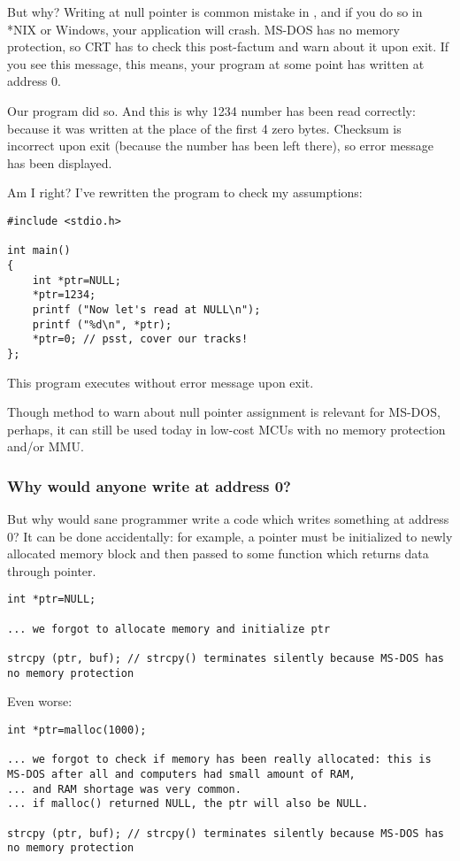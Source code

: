 But why? Writing at null pointer is common mistake in \CCpp, and if you do so in *NIX or Windows, your application will crash.
MS-DOS has no memory protection, so \ac{CRT} has to check this post-factum and warn about it upon exit.
If you see this message, this means, your program at some point has written at address 0.

Our program did so. And this is why 1234 number has been read correctly: because it was written at the place of the first 4 zero bytes.
Checksum is incorrect upon exit (because the number has been left there), so error message has been displayed.

Am I right?
I've rewritten the program to check my assumptions:

\begin{lstlisting}[style=customc]
#include <stdio.h>

int main()
{
	int *ptr=NULL;
	*ptr=1234;
	printf ("Now let's read at NULL\n");
	printf ("%d\n", *ptr);
	*ptr=0; // psst, cover our tracks!
};
\end{lstlisting}

This program executes without error message upon exit.

Though method to warn about null pointer assignment is relevant for MS-DOS,
perhaps, it can still be used today in low-cost \ac{MCU}s with no memory protection and/or \ac{MMU}.

\subsubsection{Why would anyone write at address 0?}

But why would sane programmer write a code which writes something at address 0?
It can be done accidentally: for example, a pointer must be initialized to newly allocated memory block and then passed to some function which returns data through pointer.

\begin{lstlisting}[style=customc]
int *ptr=NULL;

... we forgot to allocate memory and initialize ptr

strcpy (ptr, buf); // strcpy() terminates silently because MS-DOS has no memory protection
\end{lstlisting}

Even worse:

\begin{lstlisting}[style=customc]
int *ptr=malloc(1000);

... we forgot to check if memory has been really allocated: this is MS-DOS after all and computers had small amount of RAM,
... and RAM shortage was very common.
... if malloc() returned NULL, the ptr will also be NULL.

strcpy (ptr, buf); // strcpy() terminates silently because MS-DOS has no memory protection
\end{lstlisting}

